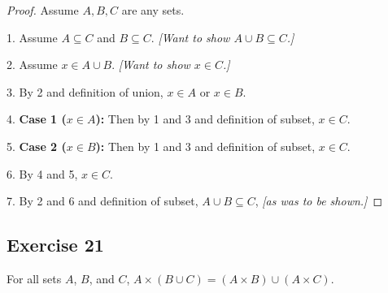 \documentclass[14pt]{extarticle}
\begin{document}
\begin{proof}
Assume $A,B,C$ are any sets.

1. Assume \(A \subseteq C\) and \(B \subseteq C\). {\it [Want to show \(A \cup B \subseteq C\).]}

2. Assume \(x \in A \cup B\). {\it [Want to show \(x \in C\).]}

3. By 2 and definition of union, $x \in A$ or $x \in B$.

4. {\bf Case 1 ($x \in A$):} Then by 1 and 3 and definition of subset, $x \in C$.

5. {\bf Case 2 ($x \in B$):} Then by 1 and 3 and definition of subset, $x \in C$.

6. By 4 and 5, $x \in C$.

7. By 2 and 6 and definition of subset, \(A \cup B \subseteq C\), {\it [as was to be shown.]}
\end{proof}

\subsection{Exercise 21}
For all sets $A$, $B$, and $C$, \(A \times (B \cup C) = (A \times B) \cup (A \times C)\).
\end{document}

